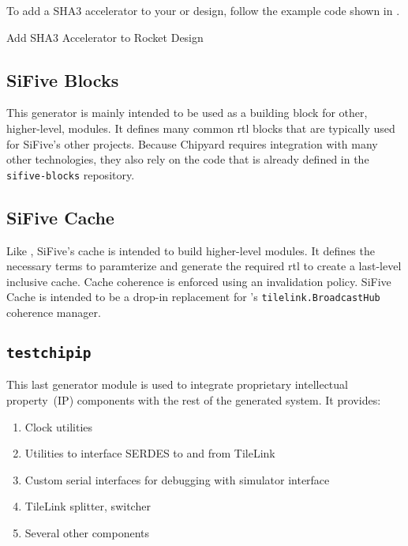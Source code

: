 To add a SHA3 accelerator to your  or  design, follow the example code shown in .

\begin{listing}[h!tbp]
\caption{Add SHA3 Accelerator to Rocket Design}
\label{lst:SHA3_Accelerator_Addition}
\end{listing}

\subsection{SiFive Blocks}\label{sec:SiFive_Blocks}
\nocite{siFiveBlocksGithub}
This generator is mainly intended to be used as a building block for other, higher-level, modules.
It defines many common \gls{rtl} blocks that are typically used for SiFive's other projects.
Because Chipyard requires integration with many other technologies, they also rely on the code that is already defined in the \texttt{sifive-blocks} repository.

\subsection{SiFive Cache}\label{sec:SiFive_Cache}
\nocite{siFiveCacheGithub}
Like , SiFive's cache is intended to build higher-level modules.
It defines the necessary terms to paramterize and generate the required \gls{rtl} to create a last-level inclusive cache.
Cache coherence is enforced using an invalidation policy.
SiFive Cache is intended to be a drop-in replacement for 's \texttt{tilelink.BroadcastHub} coherence manager.

\subsection{\texttt{testchipip}}\label{sec:testchipip}
\nocite{testchipipGithub}
This last generator module is used to integrate proprietary intellectual property~(IP) components with the rest of the generated system.
It provides:
\begin{enumerate}
\item Clock utilities
\item Utilities to interface SERDES to and from TileLink
\item Custom serial interfaces for debugging with simulator interface
\item TileLink splitter, switcher
\item Several other components
\end{enumerate}


